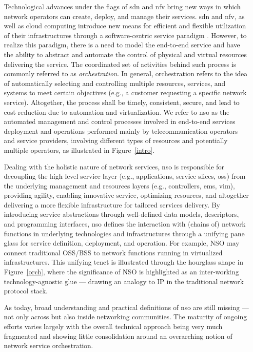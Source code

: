 Technological advances under the flags of \gls{sdn} \cite{surveySDN} and \gls{nfv} \cite{Mijumbi2016NetworkChallenges} bring new ways in which network operators can create, deploy, and manage their services. \gls{sdn} and \gls{nfv}, as well as cloud computing introduce new means for efficient and flexible utilization of their infrastructures through a software-centric service paradigm \cite{Sonkoly2014UNIFYingView}. However, to realize this paradigm, there is a need to model the end-to-end service and have the ability to abstract and automate the control of physical and virtual resources delivering the service. The coordinated set of activities behind such process is commonly referred to as \textit{orchestration}. In general, orchestration refers to the idea of automatically selecting and controlling multiple resources, services, and systems to meet certain objectives (e.g., a customer requesting a specific network service). Altogether, the process shall be timely, consistent, secure, and lead to cost reduction due to automation and virtualization. We refer to \gls{nso} as the automated management and control processes involved in end-to-end services deployment and operations  performed mainly by telecommunication operators and service providers, involving different types of resources and potentially multiple operators, as illustrated in Figure~\ref{intro}. 

Dealing with the holistic nature of network services, \gls{nso} is responsible for decoupling the high-level service layer (e.g., applications, service  slices, \gls{oss}) from the underlying management and resources layers (e.g., controllers, \gls{ems}, \gls{vim}), providing agility, enabling innovative service, optimizing resources, and altogether delivering a more flexible infrastructure for tailored services delivery. By introducing service abstractions through well-defined data models, descriptors, and programming interfaces, \gls{nso} defines the interaction with (chains of) network functions in underlying technologies and infrastructures through a unifying pane glass for service definition, deployment, and operation. For example, NSO may connect traditional OSS/BSS to network functions running in virtualized infrastructures. This unifying tenet is illustrated through  the hourglass shape in Figure~\ref{orch}, where the  significance of NSO is highlighted as an inter-working technology-agnostic glue --- drawing an analogy to IP in the traditional network protocol stack. 

As today, broad understanding and practical definitions of \gls{nso} are still missing --- not only across but also inside networking communities. The maturity of ongoing efforts varies largely with the overall technical approach being very much fragmented and showing little consolidation around an overarching notion of network service orchestration. 

